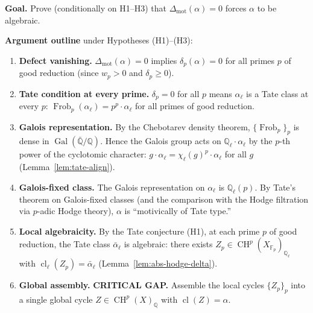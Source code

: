 \documentclass[11pt]{article}
\theoremstyle{definition}
\DeclareMathOperator{\cl}{cl}
\DeclareMathOperator{\Gal}{Gal}
\DeclareMathOperator{\Frob}{Frob}
\DeclareMathOperator{\CH}{CH}
\begin{document}
\textbf{Goal.}  Prove (conditionally on H1--H3) that
$\Delta_{\mathrm{mot}}(\alpha) = 0$ forces $\alpha$ to be algebraic.

\medskip

\textbf{Argument outline} under Hypotheses (H1)--(H3):

\begin{enumerate}[label=\textbf{Step \arabic*.}, leftmargin=3cm]
  \item \textbf{Defect vanishing.}
    $\Delta_{\mathrm{mot}}(\alpha) = 0$ implies $\delta_p(\alpha) = 0$ for
    all primes $p$ of good reduction (since $w_p > 0$ and $\delta_p \geq 0$).

  \item \textbf{Tate condition at every prime.}
    $\delta_p = 0$ for all $p$ means $\alpha_\ell$ is a Tate class at every $p$:
    $\Frob_p(\alpha_\ell) = p^p \cdot \alpha_\ell$ for all primes of good reduction.

  \item \textbf{Galois representation.}
    By the Chebotarev density theorem, $\{\Frob_p\}_p$ is dense in
    $\Gal(\bar{\mathbb{Q}}/\mathbb{Q})$.  Hence the Galois group acts on
    $\mathbb{Q}_\ell \cdot \alpha_\ell$ by the $p$-th power of the
    cyclotomic character:
    $g \cdot \alpha_\ell = \chi_\ell(g)^p \cdot \alpha_\ell$ for all
    $g$ (Lemma~\ref{lem:tate-align}).

  \item \textbf{Galois-fixed class.}
    The Galois representation on $\alpha_\ell$ is $\mathbb{Q}_\ell(p)$.
    By Tate's theorem on Galois-fixed classes (and the comparison with
    the Hodge filtration via $p$-adic Hodge theory), $\alpha$ is
    ``motivically of Tate type.''

  \item \textbf{Local algebraicity.}
    By the Tate conjecture (H1), at each prime $p$ of good reduction,
    the Tate class $\bar{\alpha}_\ell$ is algebraic: there exists
    $Z_p \in \CH^p(X_{\mathbb{F}_p})_{\mathbb{Q}_\ell}$ with
    $\cl_\ell(Z_p) = \bar{\alpha}_\ell$
    (Lemma~\ref{lem:abs-hodge-delta}).

  \item \textbf{Global assembly.}
    \textbf{CRITICAL GAP.}
    Assemble the local cycles $\{Z_p\}_{p}$ into a single global cycle
    $Z \in \CH^p(X)_{\mathbb{Q}}$ with $\cl(Z) = \alpha$.


\end{enumerate}
\end{document}
